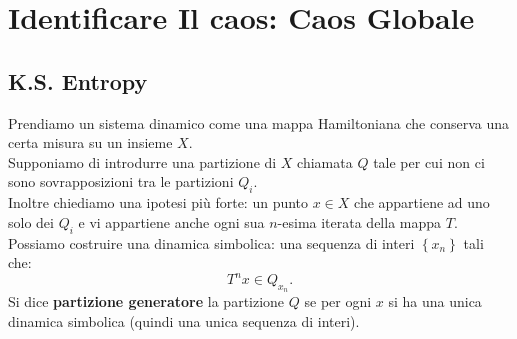 \section{Identificare Il caos: Caos Globale}%
\label{sec:Lezione 20}
\mylocaltoc
\subsection{K.S. Entropy}%
\label{sub:K.S. Entropy}
Prendiamo un sistema dinamico come una mappa Hamiltoniana che conserva una certa misura su un insieme $X$.\\
Supponiamo di introdurre una partizione di $X$ chiamata $Q$ tale per cui non ci sono sovrapposizioni tra le partizioni $Q_i$.\\
Inoltre chiediamo una ipotesi più forte: un punto $x\in X$ che appartiene ad uno solo dei $Q_i$ e vi appartiene anche ogni sua $n$-esima iterata della mappa $T$.\\
Possiamo costruire una dinamica simbolica: una sequenza di interi $\left\{x_n\right\}$ tali che:
\[
    T^nx \in Q_{x_n}
.\] 
Si dice \textbf{partizione generatore} la partizione $Q$ se per ogni $x$ si ha una unica dinamica simbolica (quindi una unica sequenza di interi).
